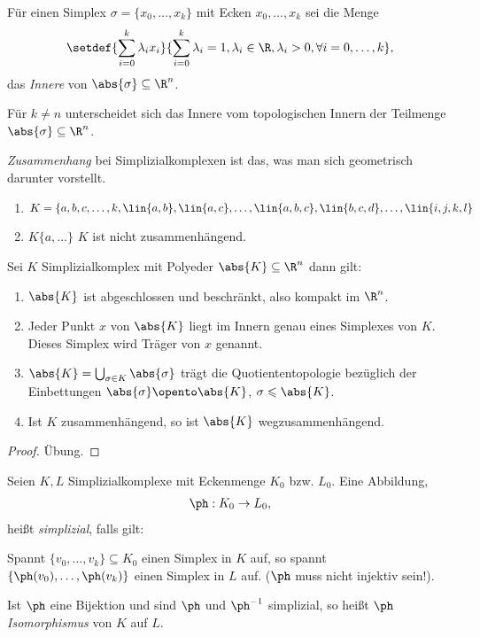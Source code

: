 \begin{defn}
\label{defn:4.1.5}
Für einen Simplex $\sigma=\{x_0,\ldots,x_k\}$ mit Ecken $x_0,\ldots,x_k$ sei
die Menge
\begin{align*}
\setdef{\sum\limits_{i=0}^k \lambda_i x_i}{\sum\limits_{i=0}^k \lambda_i = 1,
\lambda_i\in\R, \lambda_i > 0, \forall i=0,\ldots,k},
\end{align*}
das \emph{Innere} von $\abs{\sigma}\subseteq\R^n$.\fishhere
\end{defn}
Für $k\neq n$ unterscheidet sich das Innere vom topologischen Innern der
Teilmenge $\abs{\sigma}\subseteq \R^n$.
\begin{defnn}
\emph{Zusammenhang} bei Simplizialkomplexen ist das, was man sich
geometrisch darunter vorstellt.\fishhere
\end{defnn}
\begin{bspn}
\begin{enumerate}[label=\arabic{*}.)]
  \item
  $K=\{a,b,c,\ldots,k, \lin{a,b},\lin{a,c},\ldots, 
 \lin{a,b,c},\lin{b,c,d},\ldots,\lin{i,j,k,l}$
\item $K\{a,\ldots\}$
$K$ ist nicht zusammenhängend.\bsphere 
\end{enumerate}
\end{bspn}

\begin{lem}
\label{prop:4.1.6}
Sei $K$ Simplizialkomplex mit Polyeder $\abs{K}\subseteq\R^n$ dann gilt:
\begin{enumerate}[label=\arabic{*}.)]
  \item $\abs{K}$ ist abgeschlossen und beschränkt, also kompakt im $\R^n$.
  \item Jeder Punkt $x$ von $\abs{K}$ liegt im Innern genau eines Simplexes von
  $K$. Dieses Simplex wird Träger von $x$ genannt.
  \item $\abs{K}=\bigcup_{\sigma\in K} \abs{\sigma}$ trägt die
  Quotiententopologie bezüglich der Einbettungen $\abs{\sigma}\opento\abs{K}$, $\sigma\leqslant
  \abs{K}$.
  \item Ist $K$ zusammenhängend, so ist $\abs{K}$ wegzusammenhängend.\fishhere
\end{enumerate}
\end{lem}
\begin{proof}
Übung.\qedhere
\end{proof}

\begin{defn}
\label{defn:4.1.7}
Seien $K,L$ Simplizialkomplexe mit Eckenmenge $K_0$ bzw. $L_0$. Eine Abbildung,
\begin{align*}
\ph: K_0\to L_0,
\end{align*}
heißt \emph{simplizial}, falls gilt:

Spannt $\{v_0,\ldots,v_k\}\subseteq K_0$ einen Simplex in $K$ auf, so spannt
$\{\ph(v_0),\ldots,\ph(v_k)\}$ einen Simplex in $L$ auf. ($\ph$ muss nicht
injektiv sein!).

Ist $\ph$ eine Bijektion und sind $\ph$ und $\ph^{-1}$ simplizial, so heißt
$\ph$ \emph{Isomorphismus} von $K$ auf $L$.\fishhere
\end{defn}
 

